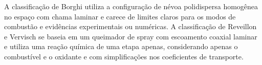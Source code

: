 A classificação de Borghi \cite{Borghi1996} utiliza a configuração de névoa polidispersa homogênea no espaço com chama laminar e carece de limites claros para os modos de combustão e evidências experimentais ou numéricas.
A classificação de Reveillon e Vervisch  \cite{ReveillonJ2005} se baseia em um queimador de spray com escoamento coaxial laminar e utiliza uma reação química de uma etapa apenas, considerando apenas o combustível e o oxidante e com simplificações nos coeficientes de transporte.









